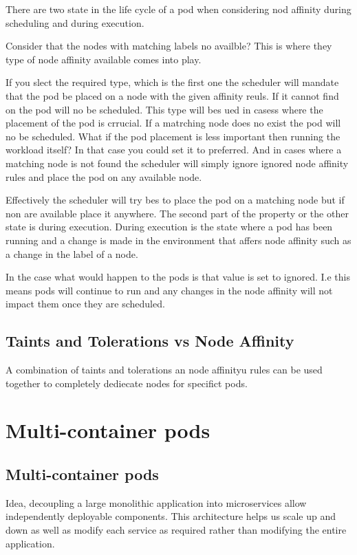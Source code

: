 \documentclass[11pt]{book}
\begin{document}
    There are two state in the life cycle of a pod when considering nod affinity during scheduling and during execution.

    Consider that the nodes with matching labels no availble?
    This is where they type of node affinity available comes into play.

    If you slect the required type, which is the first one the scheduler will mandate that the pod be placed on a node with the given affinity reuls.
    If it cannot find on the pod will no be scheduled.
    This type will bes ued in casess where the placement of the pod is crrucial.
    If a matrching node does no exist the pod will no be scheduled.
\hline
    What if the pod placement is less important then running the workload itself?
    In that case you could set it to preferred.
    And in cases where a matching node is not found the scheduler will simply ignore ignored node affinity rules and place the pod on any available node.

    Effectively the scheduler will try bes to place the pod on a matching node but if non are available place it anywhere.
\hline
    The second part of the property or the other state is during execution.
    During execution is the state where a pod has been running and a change is made in the environment that affers node affinity such as a change in the label of a node.

    In the case what would happen to the pods is that value is set to ignored.
    I.e this means pods will continue to run and any changes in the node affinity will not impact them once they are scheduled.

    \section{Taints and Tolerations vs Node Affinity}
    A combination of taints and tolerations an node affinityu rules can be used together to completely dediecate nodes for specifict pods.

    \chapter{Multi-container pods}


    \section{Multi-container pods}
    Idea, decoupling a large monolithic application into microservices allow independently deployable components.
    This architecture helps us scale up and down as well as modify each service as required rather than modifying the entire application.
\end{document}
